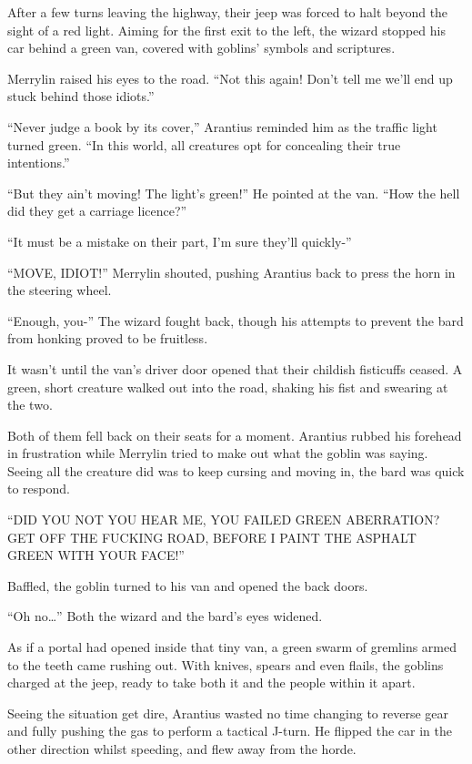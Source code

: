 After a few turns leaving the highway, their jeep was forced to halt beyond the sight of a red light. Aiming for the first exit to the left, the wizard stopped his car behind a green van, covered with goblins’ symbols and scriptures.

Merrylin raised his eyes to the road. “Not this again! Don’t tell me we’ll end up stuck behind those idiots.”

“Never judge a book by its cover,” Arantius reminded him as the traffic light turned green. “In this world, all creatures opt for concealing their true intentions.”

“But they ain’t moving! The light’s green!” He pointed at the van. “How the hell did they get a carriage licence?”

“It must be a mistake on their part, I’m sure they’ll quickly-”

“MOVE, IDIOT!” Merrylin shouted, pushing Arantius back to press the horn in the steering wheel.

“Enough, you-” The wizard fought back, though his attempts to prevent the bard from honking proved to be fruitless.

It wasn’t until the van’s driver door opened that their childish fisticuffs ceased. A green, short creature walked out into the road, shaking his fist and swearing at the two.

Both of them fell back on their seats for a moment. Arantius rubbed his forehead in frustration while Merrylin tried to make out what the goblin was saying. Seeing all the creature did was to keep cursing and moving in, the bard was quick to respond.

“DID YOU NOT YOU HEAR ME, YOU FAILED GREEN ABERRATION? GET OFF THE FUCKING ROAD, BEFORE I PAINT THE ASPHALT GREEN WITH YOUR FACE!”

Baffled, the goblin turned to his van and opened the back doors.

“Oh no…” Both the wizard and the bard’s eyes widened.

As if a portal had opened inside that tiny van, a green swarm of gremlins armed to the teeth came rushing out. With knives, spears and even flails, the goblins charged at the jeep, ready to take both it and the people within it apart.

Seeing the situation get dire, Arantius wasted no time changing to reverse gear and fully pushing the gas to perform a tactical J-turn. He flipped the car in the other direction whilst speeding, and flew away from the horde.

